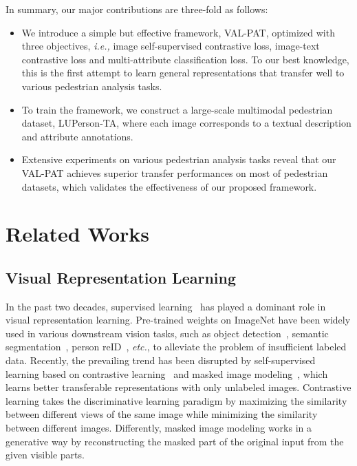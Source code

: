 \documentclass[final]{cvpr}
\begin{document}
In summary, our major contributions are three-fold as follows:
\vspace{-2mm}
\begin{itemize}
\item We introduce a simple but effective framework, VAL-PAT, optimized with three objectives, \emph{i.e.,} image self-supervised contrastive loss, image-text contrastive loss and  multi-attribute classification loss.
    To our best knowledge, this is the first attempt to learn general representations that transfer well to various pedestrian analysis tasks.
\vspace{-2mm}
    \item To train the framework, we construct a large-scale multimodal pedestrian dataset, LUPerson-TA, where each image corresponds to a textual description and attribute annotations.
    \vspace{-2mm}
    \item Extensive experiments on various pedestrian analysis tasks reveal that our VAL-PAT achieves superior transfer performances on most of pedestrian datasets, which validates the effectiveness of our proposed framework.
\end{itemize}


\section{Related Works}
\subsection{Visual Representation Learning}
In the past two decades, supervised learning~\cite{NIPS2012_c399862d,he2016deep} has played a dominant role in visual representation learning.
Pre-trained weights on ImageNet have been widely used in various downstream vision tasks, such as object detection~\cite{ren2015faster,redmon2016you,liu2016ssd}, semantic segmentation~\cite{he2017mask,long2015fully,chen2017deeplab}, person reID~\cite{sun2018beyond,he2021transreid,dai2019batch,zhang2020relation}, \emph{etc.}, to alleviate the problem of insufficient labeled data. 
Recently, the prevailing trend has been disrupted by self-supervised learning based on contrastive learning~\cite{he2020momentum,chen2020simple,wang2021dense} and masked image modeling~\cite{bao2021beit,he2022masked,xie2022simmim}, 
which learns better transferable representations with only unlabeled images.
Contrastive learning takes the discriminative learning paradigm by maximizing the similarity between different views of the same image while minimizing the similarity between different images. 
Differently, masked image modeling works in a generative way by reconstructing the masked part of the original input from the given visible parts.
\end{document}
